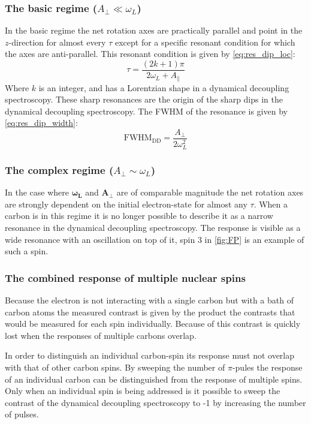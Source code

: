 \subsubsection{The basic regime ($A_\perp \ll \omega_L$)}
In the basic regime the net rotation axes are practically parallel and point in the $z$-direction for almost every $\tau$ except for a specific resonant condition for which the axes are anti-parallel.
This resonant condition is given by \cref{eq:res_dip_loc}:
 \begin{equation}
\tau = \frac{(2k+1)\pi}{2 \omega_L + A_\parallel}
\label{eq:res_dip_loc}
\end{equation}
Where $k$ is an integer, and has a Lorentzian shape in a dynamical decoupling spectroscopy.
These sharp resonances are the origin of the sharp dips in the dynamical decoupling spectroscopy.
The FWHM of the resonance is given by \cref{eq:res_dip_width}:
 \begin{equation}
\mathrm{FWHM_{DD}} = \frac{A_\perp}{2 \omega_L^2}
\label{eq:res_dip_width}
\end{equation}


\subsubsection{The complex regime ($A_\perp \sim \omega_L$)}

In the case where $\bm{\omega_L}$ and $\bm{A_\perp}$ are of comparable magnitude the net rotation axes are strongly dependent on the initial electron-state for almost any $\tau$.
When a carbon is in this regime it is no longer possible to describe it as a narrow resonance in the dynamical decoupling spectroscopy.
The response is visible as a wide resonance with an oscillation on top of it, spin 3 in \cref{fig:FP} is an example of such a spin.

\subsubsection{The combined response of multiple nuclear spins}
Because the electron is not interacting with a single carbon but with a bath of carbon atoms the measured contrast is given by the product the contrasts that would be measured for each spin individually.
Because of this contrast is quickly lost when the responses of multiple carbons overlap.

In order to distinguish an individual carbon-spin its response must not overlap with that of other carbon spins.
By sweeping the number of $\pi$-pules the response of an individual carbon can be distinguished from the response of multiple spins.
Only when an individual spin is being addressed is it possible to sweep the contrast of the dynamical decoupling spectroscopy to -1 by increasing the number of pulses.

